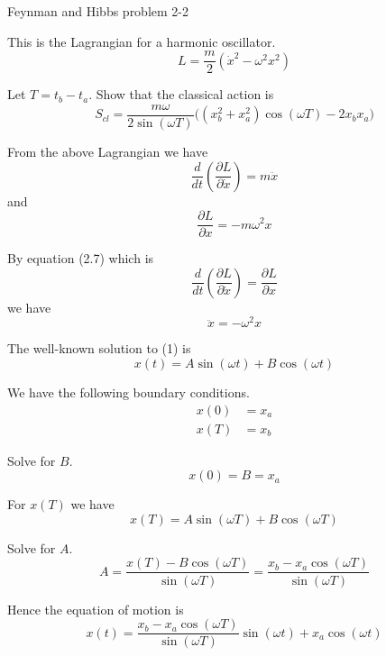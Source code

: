 \documentclass[12pt]{article}
\begin{document}
Feynman and Hibbs problem 2-2

\bigskip
This is the Lagrangian for a harmonic oscillator.
\begin{equation*}
L=\frac{m}{2}(\dot{x}^2-\omega^2 x^2)
\end{equation*}

\noindent
Let $T=t_b-t_a$.
Show that the classical action is
\begin{equation*}
S_{cl}=\frac{m\omega}{2\sin(\omega T)}
\bigg((x_b^2+x_a^2)\cos(\omega T)-2x_b x_a\bigg)
\end{equation*}

From the above Lagrangian we have
\begin{equation*}
\frac{d}{dt}\left(\frac{\partial L}{\partial\dot x}\right)=m\ddot x
\end{equation*}
and
\begin{equation*}
\frac{\partial L}{\partial x}=-m\omega^2x
\end{equation*}

By equation (2.7) which is
\begin{equation*}
\frac{d}{dt}\left(\frac{\partial L}{\partial\dot x}\right)=\frac{\partial L}{\partial x}
\end{equation*}
we have
\begin{equation*}
\ddot x=-\omega^2x
\tag{1}
\end{equation*}

The well-known solution to (1) is
\begin{equation*}
x(t)=A\sin(\omega t)+B\cos(\omega t)
\end{equation*}

We have the following boundary conditions.
\begin{align*}
x(0)&=x_a
\\
x(T)&=x_b
\end{align*}

Solve for $B$.
\begin{equation*}
x(0)=B=x_a
\end{equation*}

For $x(T)$ we have
\begin{equation*}
x(T)=A\sin(\omega T)+B\cos(\omega T)
\end{equation*}

Solve for $A$.
\begin{equation*}
A=\frac{x(T)-B\cos(\omega T)}{\sin(\omega T)}=
\frac{x_b-x_a\cos(\omega T)}{\sin(\omega T)}
\end{equation*}

Hence the equation of motion is
\begin{equation*}
x(t)=\frac{x_b-x_a\cos(\omega T)}{\sin(\omega T)}\sin(\omega t)+x_a\cos(\omega t)
\tag{2}
\end{equation*}
\end{document}
